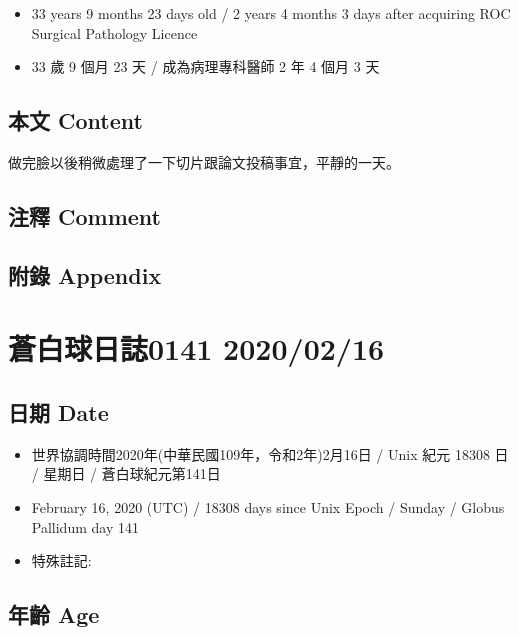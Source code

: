 \documentclass[
]{article}
\providecommand{\tightlist}{%
  \setlength{\itemsep}{0pt}\setlength{\parskip}{0pt}}
\begin{document}
\begin{itemize}
\tightlist
\item
  33 years 9 months 23 days old / 2 years 4 months 3 days after
  acquiring ROC Surgical Pathology Licence
\item
  33 歲 9 個月 23 天 / 成為病理專科醫師 2 年 4 個月 3 天
\end{itemize}

\hypertarget{ux672cux6587-content-14}{%
\subsection{本文 Content}\label{ux672cux6587-content-14}}

做完臉以後稍微處理了一下切片跟論文投稿事宜，平靜的一天。

\hypertarget{ux6ce8ux91cb-comment-14}{%
\subsection{注釋 Comment}\label{ux6ce8ux91cb-comment-14}}

\hypertarget{ux9644ux9304-appendix-14}{%
\subsection{附錄 Appendix}\label{ux9644ux9304-appendix-14}}

\hypertarget{ux84bcux767dux7403ux65e5ux8a8c0141-20200216}{%
\section{蒼白球日誌0141
2020/02/16}\label{ux84bcux767dux7403ux65e5ux8a8c0141-20200216}}

\hypertarget{ux65e5ux671f-date-15}{%
\subsection{日期 Date}\label{ux65e5ux671f-date-15}}

\begin{itemize}
\tightlist
\item
  世界協調時間2020年(中華民國109年，令和2年)2月16日 / Unix 紀元 18308 日
  / 星期日 / 蒼白球紀元第141日
\item
  February 16, 2020 (UTC) / 18308 days since Unix Epoch / Sunday /
  Globus Pallidum day 141
\item
  特殊註記:
\end{itemize}

\hypertarget{ux5e74ux9f61-age-15}{%
\subsection{年齡 Age}\label{ux5e74ux9f61-age-15}}
\end{document}
